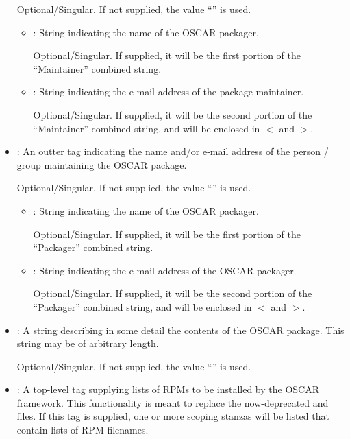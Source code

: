 \begin{itemize}
  Optional/Singular.  If not supplied, the value
  ``'' is used.

  \begin{itemize}
  \item {}: String indicating the name of the OSCAR
    packager.
    
    Optional/Singular.  If supplied, it will be the first portion of
    the ``Maintainer'' combined string.
    
  \item {}: String indicating the e-mail address of the
    package maintainer.
    
    Optional/Singular.  If supplied, it will be the second portion of
    the ``Maintainer'' combined string, and will be enclosed in $<$
    and $>$.
  \end{itemize}

\item {}: An outter tag indicating the name and/or
  e-mail address of the person / group maintaining the OSCAR package.

  Optional/Singular.  If not supplied, the value
  ``'' is used.

  \begin{itemize}
  \item {}: String indicating the name of the OSCAR
    packager.
    
    Optional/Singular.  If supplied, it will be the first portion of
    the ``Packager'' combined string.
    
  \item {}: String indicating the e-mail address of the
    OSCAR packager.
    
    Optional/Singular.  If supplied, it will be the second portion of
    the ``Packager'' combined string, and will be enclosed in $<$
    and $>$.
  \end{itemize}
    
\item {}: A string describing in some detail the
  contents of the OSCAR package.  This string may be of arbitrary
  length.
  
  Optional/Singular.  If not supplied, the value
  ``'' is used.

\item {}: A top-level tag supplying lists of RPMs to be
  installed by the OSCAR framework.  This functionality is meant to
  replace the now-deprecated  and
   files.  If this tag is supplied, one or more
  scoping stanzas will be listed that contain lists of RPM filenames.  
    

\end{itemize}
